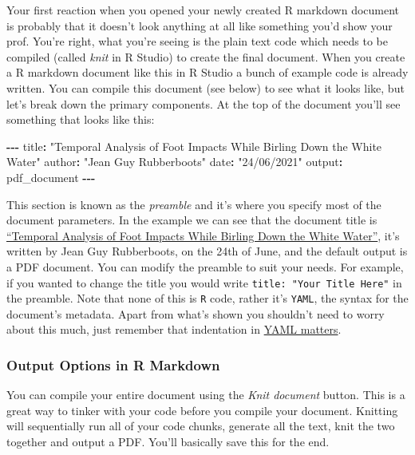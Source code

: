 \documentclass[
]{book}
\newenvironment{Shaded}{\begin{snugshade}}{\end{snugshade}}
\newcommand{\NormalTok}[1]{#1}
\newcommand{\SpecialCharTok}[1]{\textcolor[rgb]{0.81,0.36,0.00}{\textbf{#1}}}
\newcommand{\StringTok}[1]{\textcolor[rgb]{0.31,0.60,0.02}{#1}}
\begin{document}
Your first reaction when you opened your newly created R markdown document is probably that it doesn't look anything at all like something you'd show your prof. You're right, what you're seeing is the plain text code which needs to be compiled (called \emph{knit} in R Studio) to create the final document. When you create a R markdown document like this in R Studio a bunch of example code is already written. You can compile this document (see below) to see what it looks like, but let's break down the primary components. At the top of the document you'll see something that looks like this:

\begin{Shaded}
\begin{Highlighting}[]
\SpecialCharTok{{-}{-}{-}}
\NormalTok{title}\SpecialCharTok{:} \StringTok{"Temporal Analysis of Foot Impacts While Birling Down the White Water"}
\NormalTok{author}\SpecialCharTok{:} \StringTok{"Jean Guy Rubberboots"}
\NormalTok{date}\SpecialCharTok{:} \StringTok{"24/06/2021"}
\NormalTok{output}\SpecialCharTok{:}\NormalTok{ pdf\_document}
\SpecialCharTok{{-}{-}{-}}
\end{Highlighting}
\end{Shaded}

This section is known as the \emph{preamble} and it's where you specify most of the document parameters. In the example we can see that the document title is \href{https://www.youtube.com/watch?v=upsZZ2s3xv8}{``Temporal Analysis of Foot Impacts While Birling Down the White Water''}, it's written by Jean Guy Rubberboots, on the 24th of June, and the default output is a PDF document. You can modify the preamble to suit your needs. For example, if you wanted to change the title you would write \texttt{title:\ "Your\ Title\ Here"} in the preamble. Note that none of this is \texttt{R} code, rather it's \texttt{YAML}, the syntax for the document's metadata. Apart from what's shown you shouldn't need to worry about this much, just remember that indentation in \href{https://bookdown.org/yihui/R\%20Markdown/pdf-document.html}{YAML matters}.

\hypertarget{output-options-in-r-markdown}{%
\subsubsection{Output Options in R Markdown}\label{output-options-in-r-markdown}}

You can compile your entire document using the \emph{Knit document} button. This is a great way to tinker with your code before you compile your document. Knitting will sequentially run all of your code chunks, generate all the text, knit the two together and output a PDF. You'll basically save this for the end.
\end{document}
